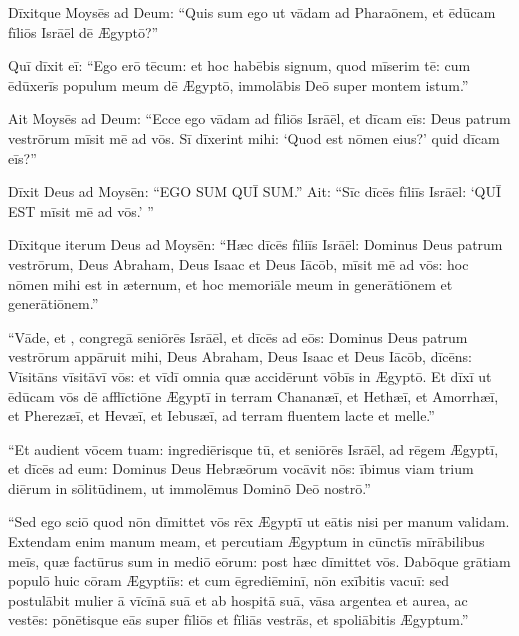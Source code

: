 Dīxitque Moysēs ad Deum: ``Quis sum ego ut vādam ad Pharaōnem,
et ēdūcam fīliōs Isrāēl dē Ægyptō?''

Quī dīxit eī: ``Ego erō tēcum: et hoc habēbis signum,
quod mīserim tē: cum ēdūxerīs populum meum dē Ægyptō,
immolābis Deō super montem istum.''

Ait Moysēs ad Deum: ``Ecce ego vādam ad fīliōs Isrāēl,
et dīcam eīs: Deus patrum vestrōrum mīsit mē ad vōs.
Sī dīxerint mihi: `Quod est nōmen eius?' quid dīcam eīs?''

Dīxit Deus ad Moysēn: ``EGO SUM QUĪ SUM.'' Ait: ``Sīc dīcēs fīliīs Isrāēl: `QUĪ EST mīsit mē ad vōs.' ''

Dīxitque iterum Deus ad Moysēn: ``Hæc dīcēs fīliīs Isrāēl:
Dominus Deus patrum vestrōrum, Deus Abraham, Deus Isaac et Deus Iācōb,
 mīsit mē ad vōs: hoc nōmen mihi est in æternum,
et hoc memoriāle meum in generātiōnem et generātiōnem.''

``Vāde, et , congregā seniōrēs Isrāēl,
et dīcēs ad eōs: Dominus Deus patrum vestrōrum appāruit mihi,
Deus Abraham, Deus Isaac et Deus Iācōb,
dīcēns: Vīsitāns vīsitāvī vōs: et vīdī omnia quæ accidērunt vōbīs in Ægyptō.
Et dīxī ut ēdūcam vōs dē afflīctiōne Ægyptī in terram Chananæī,
et Hethæī, et Amorrhæī, et Pherezæī, et Hevæī, et Iebusæī,
ad terram fluentem lacte et melle.''

``Et audient vōcem tuam: ingrediērisque tū,
et seniōrēs Isrāēl, ad rēgem Ægyptī, et dīcēs ad eum:
Dominus Deus Hebræōrum vocāvit nōs:
ībimus viam trium diērum in sōlitūdinem,
ut immolēmus Dominō Deō nostrō.''

``Sed ego sciō quod nōn dīmittet vōs rēx Ægyptī
ut eātis nisi per manum validam.
Extendam enim manum meam, et percutiam Ægyptum
in cūnctīs mīrābilibus meīs, 
quæ factūrus sum in mediō eōrum:
post hæc dīmittet vōs.
Dabōque grātiam populō huic cōram Ægyptiīs:
et cum ēgrediēminī, nōn exībitis vacuī:
sed postulābit mulier ā vīcīnā suā
et ab hospitā suā, vāsa argentea et aurea, ac vestēs:
pōnētisque eās super fīliōs et fīliās vestrās, et spoliābitis Ægyptum.''

